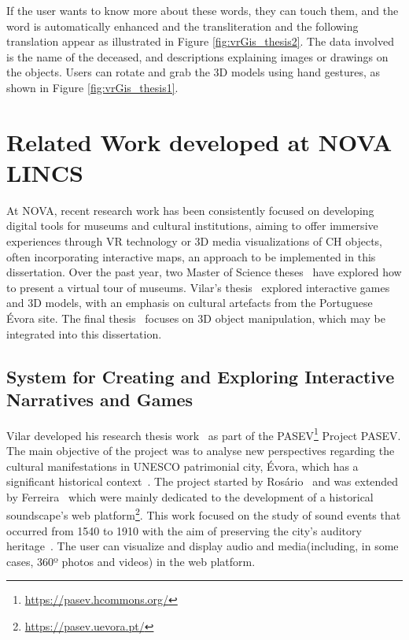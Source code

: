 If the user wants to know more about these words, they can touch them, and the word is automatically enhanced and the transliteration and the following translation appear as illustrated in Figure \ref{fig:vrGis_thesis2}. The data involved is the name of the deceased, and descriptions explaining images or drawings on the objects.
Users can rotate and grab the \gls{3D} models using hand gestures, as shown in Figure \ref{fig:vrGis_thesis1}.
\FloatBarrier

\section{Related Work developed at NOVA LINCS}
\label{sec:thesis_nova}

At NOVA, recent research work has been consistently focused on developing digital tools for museums and cultural institutions, aiming to offer immersive experiences through \gls{VR} technology or \gls{3D} media visualizations 
of \gls{CH} objects, often incorporating interactive maps, an approach to be implemented in this dissertation. Over the past year, two Master of Science theses~\cite{tese_tourCoimbra2024,tese_tourFaria2024}  have explored how to 
present a virtual tour of museums. Vilar's thesis~\cite{tese_jogosVilar2022} explored interactive games and \gls{3D} models, with an emphasis on cultural artefacts from the Portuguese Évora site. 
The final thesis~\cite{campanha2024heritage} focuses on \gls{3D} object manipulation, which may be integrated into this dissertation.


\subsection{System for Creating and Exploring Interactive Narratives and Games}
\label{sec:thesis1_nova}

Vilar developed his research thesis work~\cite{tese_jogosVilar2022} as part of the PASEV\footnote{\url{https://pasev.hcommons.org/}} Project \gls{PASEV}. 
The main objective of the project was to analyse new perspectives regarding the cultural manifestations in UNESCO patrimonial city, Évora,
which has a significant historical context~\cite{vilar2024extended}. The project started by Rosário~\cite{rosario2021responsive} and was extended by Ferreira~\cite{FerreiraEtAl2022} which were mainly dedicated to the development of a historical soundscape's web platform\footnote{\url{https://pasev.uevora.pt/}}. 
This work focused on the study of sound events that occurred from 1540 to 1910 with the aim of preserving the city's auditory heritage~\cite{rodrigues2021using}. The user can
visualize and display audio and media(including, in some cases, 360º photos and videos) in the web platform.

